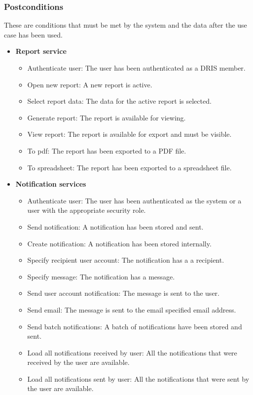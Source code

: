 \documentclass[12pt]{article}
\begin{document}
\subsubsection{Postconditions}
These are conditions that must be met by the system and the data after the use case has been used.\\
\begin{itemize}
		
	\item \textbf{Report service}
		\begin{itemize}
			\item Authenticate user: The user has been authenticated as a DRIS member.
			\item Open new report: A new report is active.
			\item Select report data: The data for the active report is selected.
			\item Generate report: The report is available for viewing.
			\item View report: The report is available for export and must be visible.
			\item To pdf: The report has been exported to a PDF file.
			\item To spreadsheet: The report has been exported to a spreadsheet file.	
		\end{itemize}
	
	\item \textbf{Notification services}
		\begin{itemize}
			\item Authenticate user: The user has been authenticated as the system or a user with the appropriate security role.
			\item Send notification: A notification has been stored and sent.
			\item Create notification: A notification has been stored internally.
			\item Specify recipient user account: The notification has a a recipient.				
			\item Specify message: The notification has a message.
			\item Send user account notification: The message is sent to the user.
			\item Send email: The message is sent to the email specified email address.
			\item Send batch notifications: A batch of notifications have been stored and sent.
			\item Load all notifications received by user: All the notifications that were received by the user are available.
			\item Load all notifications sent by user: All the notifications that were sent by the user are available.
		\end{itemize}
	

\end{itemize}
\end{document}

